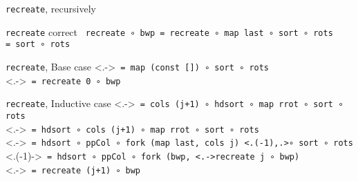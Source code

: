 \documentclass{beamer}
\begin{document}
  \begin{frame}[fragile]{\texttt{recreate}, recursively}
    \begin{block}{\texttt{recreate} correct}
      \texttt{%
        recreate \only<2->{j }∘ bwp
        = recreate ∘ map last ∘ sort ∘ rots\\
        = sort ∘ rots
      }%
    \end{block}
  \end{frame}

  \begin{frame}[fragile]{\texttt{recreate}, Base case}
    \uncover<.->{\texttt{%
      = map (const []) ∘ sort ∘ rots \\
    }}
    \uncover<.->{\texttt{%
      = recreate 0 ∘ bwp
    }}
  \end{frame}

  \begin{frame}[fragile]{\texttt{recreate}, Inductive case}
    \uncover<.->{\texttt{%
        = \alert<+>{cols (j+1) ∘ hdsort} ∘ map rrot ∘ sort ∘ rots \\
    }}
    \uncover<.->{\texttt{%
        = hdsort ∘ \alert<+>{cols (j+1) ∘ map rrot} ∘ sort ∘ rots \\
    }}
    \uncover<.->{\texttt{%
        = hdsort ∘ ppCol ∘ fork (\alert<+>{map last}, \alert<+>{cols j})
        \alert<.(-1),.>{∘ sort ∘ rots} \\
    }}
    \uncover<.(-1)->{\texttt{%
        = hdsort ∘ ppCol ∘ fork (bwp, \uncover<.->{recreate j ∘ bwp}) \\
    }}
    \uncover<.->{\texttt{%
        = recreate (j+1) ∘ bwp
    }}
  \end{frame}
\end{document}
